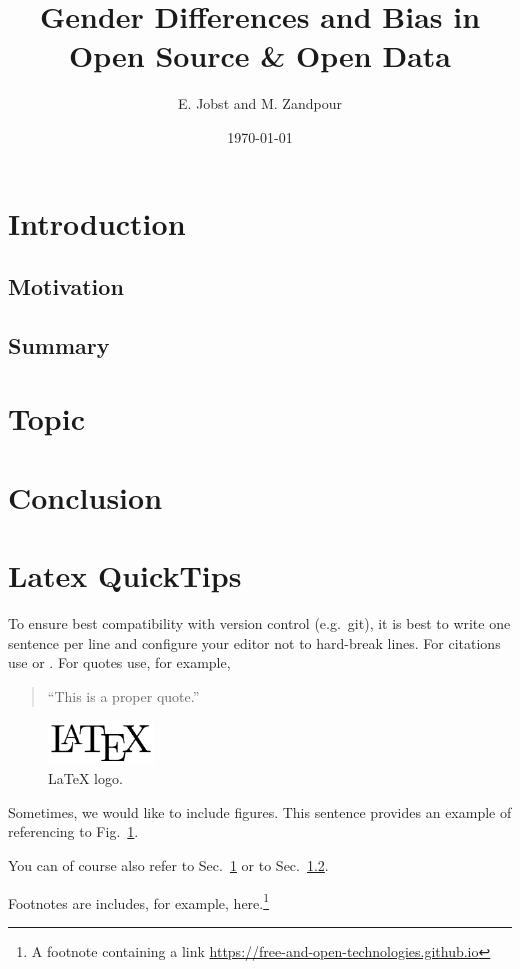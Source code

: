 \documentclass[a4paper, 11pt]{article}
\title{Gender Differences and Bias in Open Source \& Open Data}
\begin{document}
\date{\today}
\author{E. Jobst and M. Zandpour}
\maketitle

\section{Introduction} \label{sec:intro}

\subsection{Motivation} \label{sec:intro:motivation}

\subsection{Summary} \label{sec:intro:motivation}

\section{Topic} \label{sec:topic}

\section{Conclusion} \label{sec:conclusion}




\doclicenseThis

\section{Latex QuickTips} \label{sec:tips}

To ensure best compatibility with version control (e.g.\ git), it is best to write one sentence per line and configure your editor not to hard-break lines.
For citations use \cite{BakSchaLewRotBla11} or \cite[p.\ 6--8]{BakSchaLewRotBla11}.
For quotes use, for example,
\begin{quote}
	``This is a proper quote.'' \cite[p.\ 6]{BakSchaLewRotBla11}
\end{quote}

\begin{figure}[t]
	\centering
	\includegraphics[width=0.25\textwidth]{figures/logo.png}
\caption{LaTeX logo.} \label{fig:logo}
\end{figure}

Sometimes, we would like to include figures.
This sentence provides an example of referencing to Fig.~\ref{fig:logo}.

You can of course also refer to Sec.~\ref{sec:intro} or to Sec.~\ref{sec:intro:motivation}.

Footnotes are includes, for example, here.\footnote{A footnote containing a link \url{https://free-and-open-technologies.github.io}}
\end{document}
